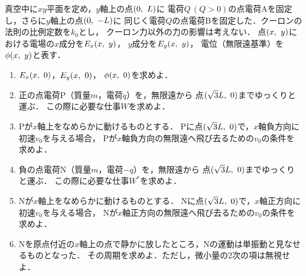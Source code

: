 \documentclass[../../../physics-standard_questions_all.tex]{subfiles}
\begin{document}
真空中に$xy$平面を定め，$y$軸上の点$(0, \hspace{1.2mm} L)$に
電荷$Q\,(Q>0)$の点電荷Aを固定し，さらに$y$軸上の点$(0, \hspace{1.2mm} -L)$に
同じく電荷$Q$の点電荷Bを固定した．クーロンの法則の比例定数を$k_0$とし，
クーロン力以外の力の影響は考えない．
点$(x, \hspace{1.2mm} y)$における電場の$x$成分を$E_x(x, \hspace{1.2mm} y)$，
$y$成分を$E_y(x, \hspace{1.2mm} y)$，
電位（無限遠基準）を$\phi(x, \hspace{1.2mm} y)$と表す．

\begin{enumerate}

    \item $E_x(x, \hspace{1.2mm} 0)$，$E_y(x, \hspace{1.2mm} 0)$，
    $\phi(x, \hspace{1.2mm} 0)$を求めよ．

    \item 正の点電荷P（質量$m$，電荷$q$）を，無限遠から
    点$(\sqrt{3}L, \hspace{1.2mm} 0)$までゆっくりと運ぶ．
    この際に必要な仕事$W$を求めよ．

    \item Pが$x$軸上をなめらかに動けるものとする．
    Pに点$(\sqrt{3}L, \hspace{1.2mm} 0)$で，$x$軸負方向に初速$v_0$を与える場合，
    Pが$x$軸負方向の無限遠へ飛び去るための$v_0$の条件を求めよ．

    \item 負の点電荷N（質量$m$，電荷$-q$）を，無限遠から
    点$(\sqrt{3}L, \hspace{1.2mm} 0)$までゆっくりと運ぶ．
    この際に必要な仕事$W^*$を求めよ．

    \item Nが$x$軸上をなめらかに動けるものとする．
    Nに点$(\sqrt{3}L, \hspace{1.2mm} 0)$で，$x$軸正方向に初速$v_0$を与える場合，
    Nが$x$軸正方向の無限遠へ飛び去るための$v_0$の条件を求めよ．

    \item Nを原点付近の$x$軸上の点で静かに放したところ，Nの運動は単振動と見なせるものとなった．
    その周期を求めよ．ただし，微小量の2次の項は無視せよ．

\end{enumerate}
\end{document}

